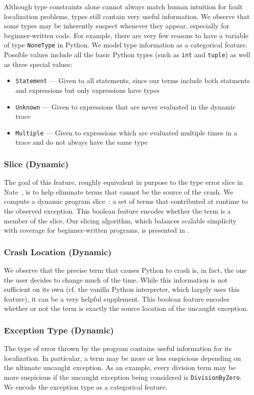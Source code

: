 \documentclass[conference]{IEEEtran}
\newcommand\lt[1]{{\lstinline|#1|}}
\begin{document}
Although type constraints alone cannot always match human intuition for
fault localization problems, types still contain very useful information.
We observe that some types may be inherently suspect whenever they appear,
especially for beginner-written code. For example, there are very few
reasons to have a variable of type \lt{NoneType} in Python. We model
type information as a categorical feature. Possible
values include all the basic Python types (such as \lt{int}
and \lt{tuple}) as well as three special values:
\begin{itemize}
    \item \lt{Statement} --- Given to all statements, since our terms
    include both statments and expressions but only expressions
    have types
    \item \lt{Unknown} --- Given to expressions that are never evaluated in the dynamic
    trace
    \item \lt{Multiple} --- Given to expressions which are evaluated multiple times in
    a trace and do not always have the same type
\end{itemize}

\subsubsection{Slice (Dynamic)}
The goal of this feature, roughly equivalent in purpose to the type error
slice in Nate~\cite{learning-to-blame}, is to help eliminate terms that
cannot be the source of the crash. We compute a dynamic program
slice~\cite{KOREL1988155}: a set of terms that contributed at runtime to
the observed exception. This boolean feature encodes whether the term
is a member of the slice. Our slicing algorithm, which balances scalable
simplicity with coverage for beginner-written programs, is presented in
.

\subsubsection{Crash Location (Dynamic)} We observe that the precise term that
causes Python to crash is, in fact, the one the user decides to change
much of the time. While this information is not sufficient on its own
(cf. the vanilla Python interpreter, which largely uses this feature),
it can be a very helpful supplement. This boolean feature encodes whether
or not the term is exactly the source location of the uncaught exception.

\subsubsection{Exception Type (Dynamic)} The type of error thrown by the program
contains useful information for its localization. In particular, a term may be
more or less suspicious depending on the ultimate uncaught exception. As an
example, every division term may be more suspicious if the uncaught exception
being considered is \lt{DivisionByZero}. We encode the exception type as
a categorical feature.
\end{document}
